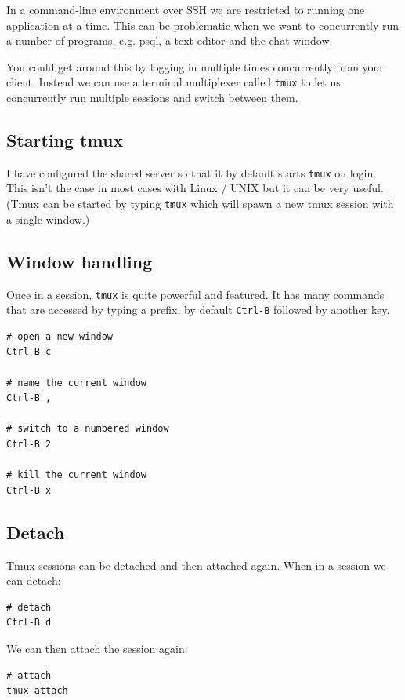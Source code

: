 \documentclass{pgnotes}
\begin{document}
In a command-line environment over SSH we are restricted to running one application at a time.
This can be problematic when we want to concurrently run a number of programs, e.g. psql, a text editor and the chat window. 

You could get around this by logging in multiple times concurrently from your client.
Instead we can use a terminal multiplexer called \texttt{tmux} to let us concurrently run multiple sessions and switch between them.

\subsection{Starting tmux}

I have configured the shared server so that it by default starts \texttt{tmux} on login.
This isn't the case in most cases with Linux / UNIX but it can be very useful.
(Tmux can be started by typing \texttt{tmux} which will spawn a new tmux session with a single window.)

\subsection{Window handling}

Once in a session, \texttt{tmux} is quite powerful and featured.
It has many commands that are accessed by typing a prefix, by default \texttt{Ctrl-B} followed by another key.

\begin{verbatim}
# open a new window
Ctrl-B c

# name the current window
Ctrl-B , 

# switch to a numbered window 
Ctrl-B 2

# kill the current window
Ctrl-B x 
\end{verbatim}

\subsection{Detach}

Tmux sessions can be detached and then attached again.
When in a session we can detach:
\begin{verbatim}
# detach 
Ctrl-B d 
\end{verbatim}

We can then attach the session again:
\begin{verbatim}
# attach
tmux attach
\end{verbatim}
\end{document}
